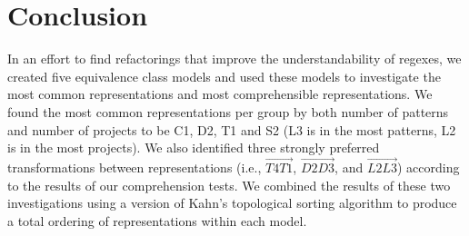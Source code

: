 
\section{Conclusion}
In an effort to find refactorings that improve the understandability of regexes, we created five equivalence class models and used these models to investigate the most common representations and most comprehensible representations.  We found the most common representations per group by both number of patterns and number of projects to be C1, D2, T1 and S2 (L3 is in the most patterns, L2 is in the most projects).
We also identified three strongly preferred transformations between representations (i.e., $\overrightarrow{T4 T1}$, $\overrightarrow{D2 D3}$, and  $\overrightarrow{L2 L3}$) according to the results of our comprehension tests.  We combined the results of these two investigations using a version of Kahn's topological sorting algorithm to produce a total ordering of representations within each model.
